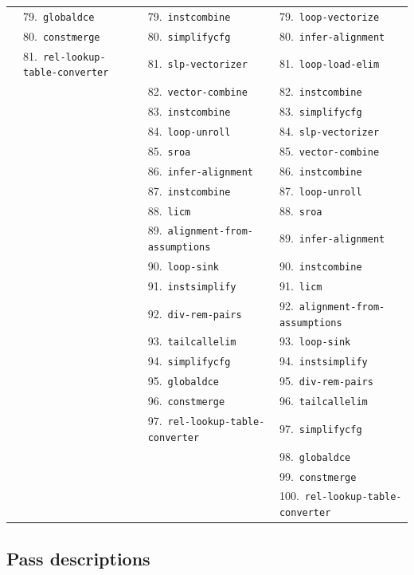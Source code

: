 \documentclass[11pt,a4paper]{article}
\begin{document}
{\begin{longtable}{llll}
 & 79.~\texttt{globaldce} & 79.~\texttt{instcombine} & 79.~\texttt{loop-vectorize} \\
 & 80.~\texttt{constmerge} & 80.~\texttt{simplifycfg} & 80.~\texttt{infer-alignment} \\
 & 81.~\texttt{rel-lookup-table-converter} & 81.~\texttt{slp-vectorizer} & 81.~\texttt{loop-load-elim} \\
 &  & 82.~\texttt{vector-combine} & 82.~\texttt{instcombine} \\
 &  & 83.~\texttt{instcombine} & 83.~\texttt{simplifycfg} \\
 &  & 84.~\texttt{loop-unroll} & 84.~\texttt{slp-vectorizer} \\
 &  & 85.~\texttt{sroa} & 85.~\texttt{vector-combine} \\
 &  & 86.~\texttt{infer-alignment} & 86.~\texttt{instcombine} \\
 &  & 87.~\texttt{instcombine} & 87.~\texttt{loop-unroll} \\
 &  & 88.~\texttt{licm} & 88.~\texttt{sroa} \\
 &  & 89.~\texttt{alignment-from-assumptions} & 89.~\texttt{infer-alignment} \\
 &  & 90.~\texttt{loop-sink} & 90.~\texttt{instcombine} \\
 &  & 91.~\texttt{instsimplify} & 91.~\texttt{licm} \\
 &  & 92.~\texttt{div-rem-pairs} & 92.~\texttt{alignment-from-assumptions} \\
 &  & 93.~\texttt{tailcallelim} & 93.~\texttt{loop-sink} \\
 &  & 94.~\texttt{simplifycfg} & 94.~\texttt{instsimplify} \\
 &  & 95.~\texttt{globaldce} & 95.~\texttt{div-rem-pairs} \\
 &  & 96.~\texttt{constmerge} & 96.~\texttt{tailcallelim} \\
 &  & 97.~\texttt{rel-lookup-table-converter} & 97.~\texttt{simplifycfg} \\
 &  &  & 98.~\texttt{globaldce} \\
 &  &  & 99.~\texttt{constmerge} \\
 &  &  & 100.~\texttt{rel-lookup-table-converter} \\
\hline
\end{longtable}
}

\subsection*{Pass descriptions}
\end{document}
